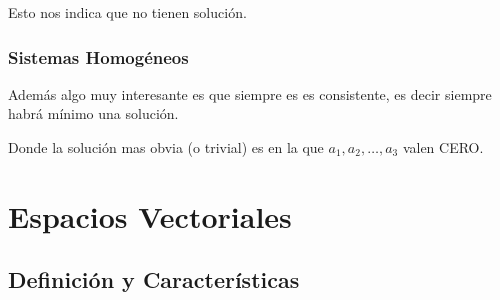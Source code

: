 \documentclass[12pt]{report}                                    %
\begin{document}
                Esto nos indica que no tienen solución.


























        \clearpage
        \section{Sistemas Homogéneos}

            Además algo muy interesante es que siempre es es consistente, es decir
            siempre habrá mínimo una solución.

            Donde la solución mas obvia (o trivial) es en la que $a_1, a_2, \dots, a_3$
            valen CERO.






\part{Espacios Vectoriales}
\clearpage


    \chapter{Definición y Características}

        \clearpage
\end{document}
